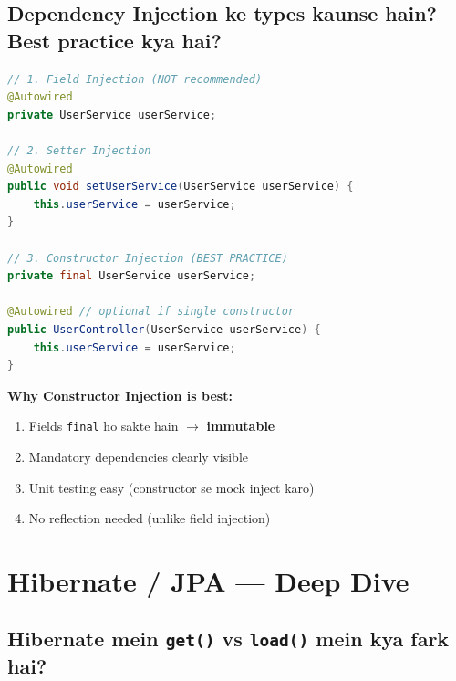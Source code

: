 \documentclass[12pt,a4paper]{article}
\begin{document}
\subsection{Dependency Injection ke types kaunse hain? Best practice kya hai?}

\begin{answerbox}
\begin{lstlisting}[language=Java]
// 1. Field Injection (NOT recommended)
@Autowired
private UserService userService;

// 2. Setter Injection
@Autowired
public void setUserService(UserService userService) {
    this.userService = userService;
}

// 3. Constructor Injection (BEST PRACTICE)
private final UserService userService;

@Autowired // optional if single constructor
public UserController(UserService userService) {
    this.userService = userService;
}
\end{lstlisting}
\textbf{Why Constructor Injection is best:}
\begin{enumerate}
    \item Fields \texttt{final} ho sakte hain $\rightarrow$ \textbf{immutable}
    \item Mandatory dependencies clearly visible
    \item Unit testing easy (constructor se mock inject karo)
    \item No reflection needed (unlike field injection)
\end{enumerate}
\end{answerbox}

\section{Hibernate / JPA --- Deep Dive}

\setcounter{subsection}{66}

\subsection{Hibernate mein \texttt{get()} vs \texttt{load()} mein kya fark hai?}
\end{document}
